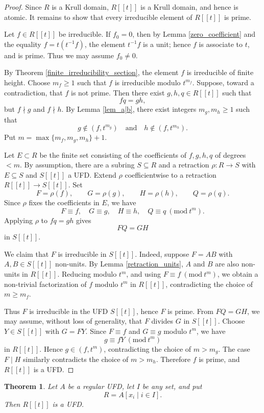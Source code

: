 \documentclass{article}
\newcommand{\Mod}[1]{\ (\mathrm{mod}\ #1)}
\theoremstyle{plain}
\newtheorem{theorem}{Theorem}[section]
\theoremstyle{definition}
\theoremstyle{remark}
\theoremstyle{plain}
\begin{document}
\begin{proof}
Since $R$ is a Krull domain, $R[[t]]$ is a Krull domain, and hence is atomic. It remains to show that every irreducible element of $R[[t]]$ is prime.

Let $f\in R[[t]]$ be irreducible. If $f_0=0$, then by Lemma \ref{zero_coefficient} and the equality $f=t(t^{-1}f)$, the element $t^{-1}f$ is a unit; hence $f$ is associate to $t$, and is prime. Thus we may assume $f_0\neq 0$.

By Theorem \ref{finite_irreducibility_section}, the element $f$ is irreducible of finite height. Choose $m_f\ge 1$ such that $f$ is irreducible modulo $t^{m_f}$. Suppose, toward a contradiction, that $f$ is not prime. Then there exist $g,h,q\in R[[t]]$ such that
$$
fq=gh,
$$
but $f\nmid g$ and $f\nmid h$. By Lemma \ref{lem_a|b}, there exist integers $m_g,m_h\ge 1$ such that
$$
g\notin (f,t^{m_g})\quad\text{and}\quad h\notin (f,t^{m_h}).
$$
Put $m=\max\{m_f,m_g,m_h\}+1$.

Let $E\subset R$ be the finite set consisting of the coefficients of $f,g,h,q$ of degrees $<m$. By assumption, there are a subring $S\subseteq R$ and a retraction $\rho:R\to S$ with $E\subseteq S$ and $S[[t]]$ a UFD. Extend $\rho$ coefficientwise to a retraction $R[[t]]\to S[[t]]$. Set
$$
F=\rho(f),\qquad G=\rho(g),\qquad H=\rho(h),\qquad Q=\rho(q).
$$
Since $\rho$ fixes the coefficients in $E$, we have
$$
F\equiv f,
\quad G\equiv g,
\quad H\equiv h,
\quad Q\equiv q \Mod{t^m}.
$$
Applying $\rho$ to $fq=gh$ gives
$$
FQ=GH
$$
in $S[[t]]$.

We claim that $F$ is irreducible in $S[[t]]$. Indeed, suppose $F=AB$ with $A,B\in S[[t]]$ non-units. By Lemma \ref{retraction_units}, $A$ and $B$ are also non-units in $R[[t]]$. Reducing modulo $t^m$, and using $F\equiv f\Mod{t^m}$, we obtain a non-trivial factorization of $f$ modulo $t^m$ in $R[[t]]$, contradicting the choice of $m\ge m_f$.

Thus $F$ is irreducible in the UFD $S[[t]]$, hence $F$ is prime. From $FQ=GH$, we may assume, without loss of generality, that $F$ divides $G$ in $S[[t]]$. Choose $Y\in S[[t]]$ with $G=FY$. Since $F\equiv f$ and $G\equiv g$ modulo $t^m$, we have
$$
g\equiv fY \Mod{t^m}
$$
in $R[[t]]$. Hence $g\in (f,t^m)$, contradicting the choice of $m>m_g$. The case $F\mid H$ similarly contradicts the choice of $m>m_h$. Therefore $f$ is prime, and $R[[t]]$ is a UFD.
\end{proof}

\begin{theorem}\label{regular_UFD_polynomial_theorem}
Let $A$ be a regular UFD, let $I$ be any set, and put
$$
R=A[x_i\mid i\in I].
$$
Then $R[[t]]$ is a UFD.
\end{theorem}
\end{document}
